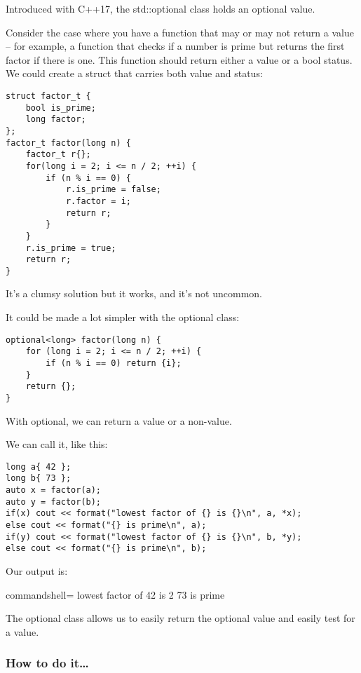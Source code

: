 
Introduced with C++17, the std::optional class holds an optional value.

Consider the case where you have a function that may or may not return a value – for example, a function that checks if a number is prime but returns the first factor if there is one. This function should return either a value or a bool status. We could create a struct that carries both value and status:

\begin{lstlisting}[style=styleCXX]
struct factor_t {
	bool is_prime;
	long factor;
};
factor_t factor(long n) {
	factor_t r{};
	for(long i = 2; i <= n / 2; ++i) {
		if (n % i == 0) {
			r.is_prime = false;
			r.factor = i;
			return r;
		}
	}
	r.is_prime = true;
	return r;
}
\end{lstlisting}

It's a clumsy solution but it works, and it's not uncommon.

It could be made a lot simpler with the optional class:

\begin{lstlisting}[style=styleCXX]
optional<long> factor(long n) {
	for (long i = 2; i <= n / 2; ++i) {
		if (n % i == 0) return {i};
	}
	return {};
}
\end{lstlisting}

With optional, we can return a value or a non-value.

We can call it, like this:

\begin{lstlisting}[style=styleCXX]
long a{ 42 };
long b{ 73 };
auto x = factor(a);
auto y = factor(b);
if(x) cout << format("lowest factor of {} is {}\n", a, *x);
else cout << format("{} is prime\n", a);
if(y) cout << format("lowest factor of {} is {}\n", b, *y);
else cout << format("{} is prime\n", b);
\end{lstlisting}

Our output is:

\begin{tcblisting}{commandshell={}}
lowest factor of 42 is 2
73 is prime
\end{tcblisting}

The optional class allows us to easily return the optional value and easily test for a value.

\subsubsection{How to do it…}

